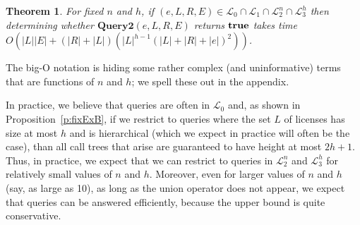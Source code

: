 \documentclass{acmtrans2m}
\newtheorem{theorem}{Theorem}[section]
\newcommand{\thm}{\begin{theorem}}
\newcommand{\ethm}{\end{theorem}}
\newcommand{\<}{
}
\renewcommand{\>}{\rangle}
\newcommand{\cL}{\mathcal{L}}
\newcommand{\len}[1]{|#1|}
\newcommand{\true}{\mathit{\bf{true}}}
\newcommand{\cc}{e}
\newcommand{\scc}{E}
\newcommand{\XProcTwo}{\textbf{Query2}}
\newcommand{\numP}{n}
\newcommand{\lenC}{h}
\begin{document}
\thm\label{t:NPHardAll1}
For fixed $n$ and $h$, if $(\cc, L, R, \scc) \in\cL_0\cap\cL_1\cap\cL_2^{\numP}\cap\cL_3^{\lenC}$
then determining whether $\XProcTwo(\cc, L, R, \scc)$ returns $\true$ takes time
$O(\len{L}\len{E} + (\len{R} + \len{L})(\len{L}^{h-1}(\len{L} + \len{R}+ \len{\cc})^2))$.
\ethm
\noindent The big-O notation is hiding some rather complex (and uninformative) terms that are functions of
$n$ and $h$; we spell these out in the appendix.

In practice, we believe that queries are often in $\cL_0$ and, as shown in Proposition~\ref{p:fixExB}, if
we restrict to queries where the set $L$ of licenses has size at most $h$ and is hierarchical (which we
expect in practice will often be the case), than all call trees that arise are guaranteed to have height
at most $2h+1$.  Thus, in practice, we expect that we can restrict to queries in $\cL_2^n$ and $\cL_3^h$
for relatively small values of $n$ and $h$.  Moreover, even for larger values of $n$ and $h$ (say, as
large as 10), as long as the union operator does not appear, we expect that queries can be answered
efficiently, because the upper bound is quite conservative.
\end{document}
